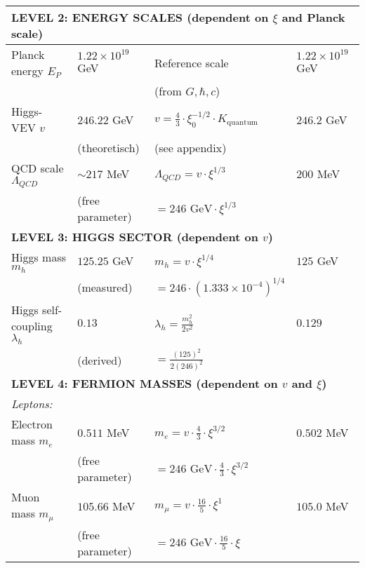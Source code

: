 \documentclass[12pt,a4paper]{article}
\begin{document}
\begin{longtable}{p{5cm}p{4cm}p{3.5cm}p{3.5cm}}
	\midrule
	\multicolumn{4}{l}{\textbf{LEVEL 2: ENERGY SCALES (dependent on $\xi$ and Planck scale)}} \\
	\midrule
	
	Planck energy $E_P$ & $1.22 \times 10^{19}$ GeV & Reference scale & $1.22 \times 10^{19}$ GeV \\
	& & (from $G, \hbar, c$) & \\[0.3em]
	
Higgs-VEV $v$ & $246.22$ GeV & $v = \frac{4}{3} \cdot \xi_0^{-1/2} \cdot K_{\text{quantum}}$ & $246.2$ GeV \\
& (theoretisch) & (see appendix) & \\[0.3em]
	
	QCD scale $\Lambda_{QCD}$ & $\sim 217$ MeV & $\Lambda_{QCD} = v \cdot \xi^{1/3}$ & $200$ MeV \\
	& (free parameter) & $= 246 \text{ GeV} \cdot \xi^{1/3}$ & \\[0.3em]
	
	\midrule
	\multicolumn{4}{l}{\textbf{LEVEL 3: HIGGS SECTOR (dependent on $v$)}} \\
	\midrule
	
	Higgs mass $m_h$ & $125.25$ GeV & $m_h = v \cdot \xi^{1/4}$ & $125$ GeV \\
	& (measured) & $= 246 \cdot (1.333 \times 10^{-4})^{1/4}$ & \\[0.3em]
	
	Higgs self-coupling $\lambda_h$ & $0.13$ & $\lambda_h = \frac{m_h^2}{2v^2}$ & $0.129$ \\
	& (derived) & $= \frac{(125)^2}{2(246)^2}$ & \\[0.3em]
	
	\midrule
	\multicolumn{4}{l}{\textbf{LEVEL 4: FERMION MASSES (dependent on $v$ and $\xi$)}} \\
	\midrule
	
	\multicolumn{4}{l}{\textit{Leptons:}} \\
	
	Electron mass $m_e$ & $0.511$ MeV & $m_e = v \cdot \frac{4}{3} \cdot \xi^{3/2}$ & $0.502$ MeV \\
	& (free parameter) & $= 246 \text{ GeV} \cdot \frac{4}{3} \cdot \xi^{3/2}$ & \\[0.3em]
	
	Muon mass $m_\mu$ & $105.66$ MeV & $m_\mu = v \cdot \frac{16}{5} \cdot \xi^1$ & $105.0$ MeV \\
	& (free parameter) & $= 246 \text{ GeV} \cdot \frac{16}{5} \cdot \xi$ & \\[0.3em]
	

\end{longtable}
\end{document}
